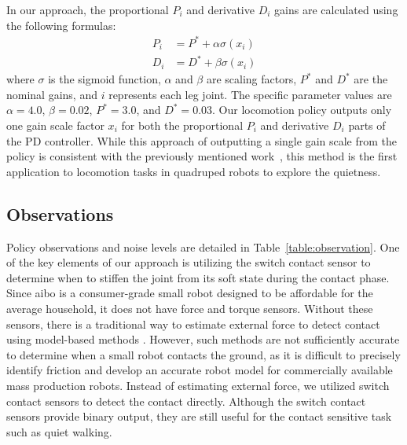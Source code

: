 In our approach, the proportional $P_i$ and derivative $D_i$ gains are calculated using the following formulas:
\begin{equation}
\begin{split}
P_i &= P^* + \alpha\sigma({x}_{i}) \\
D_i &= D^* + \beta\sigma({x}_{i})
\end{split}
\label{eq:pd_gain_scale}
\end{equation}
where $\sigma$ is the sigmoid function, $\alpha$ and $\beta$ are scaling factors, $P^*$ and $D^*$ are the nominal gains, and $i$ represents each leg joint. The specific parameter values are $\alpha = 4.0$, $\beta = 0.02$, $P^* = 3.0$, and $D^* = 0.03$.
Our locomotion policy outputs only one gain scale factor $x_i$ for both the proportional $P_i$ and derivative $D_i$ parts of the PD controller. 
While this approach of outputting a single gain scale from the policy is consistent with the previously mentioned work~\cite{bogdanovic2020learning}, this method is the first application to locomotion tasks in quadruped robots to explore the quietness.

\subsection{Observations}
Policy observations and noise levels are detailed in Table~\ref{table:observation}. One of the key elements of our approach is utilizing the switch contact sensor to determine when to stiffen the joint from its soft state during the contact phase. Since aibo is a consumer-grade small robot designed to be affordable for the average household, it does not have force and torque sensors. Without these sensors, there is a traditional way to estimate external force to detect contact using model-based methods \cite{traditional_torque_control}. However, such methods are not sufficiently accurate to determine when a small robot contacts the ground, as it is difficult to precisely identify friction and develop an accurate robot model for commercially available mass production robots. Instead of estimating external force, we utilized switch contact sensors to detect the contact directly. Although the switch contact sensors provide binary output, they are still useful for the contact sensitive task such as quiet walking.


